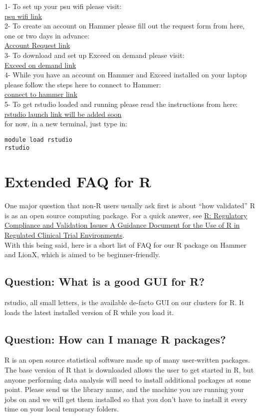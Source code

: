 \documentclass[12pt]{article}
\begin{document}
1- To set up your psu wifi please visit: \\
\href{http://wireless.psu.edu/using.html}{psu wifi link }\\
2- To create an account on Hammer please fill out the request form from here, one or two days in advance:\\
\href{https://rcc.its.psu.edu/resources/accounts/individual/}{Account Request link }\\
3- To download and set up Exceed on demand please visit: \\
\href{http://rcc.its.psu.edu/user_guides/remote_display/exceed_on_demand/}{Exceed on demand link }\\
4- While you have an account on Hammer and Exceed installed on your laptop please follow the steps here to connect to Hammer: \\
\href{http://rcc.its.psu.edu/user_guides/systems/hammer/}{connect to hammer link }\\
5- To get rstudio loaded and running please read the instructions from here: \\
\href{}{rstudio launch link will be added soon }\\
for now, in a new terminal, just type in: 
\begin{verbatim}
module load rstudio
rstudio
\end{verbatim}

\section{Extended FAQ for R}
One major question that non-R users usually ask first is about ``how validated'' R is as an open source computing package. For a quick answer, see \href{http://www.r-project.org/doc/R-FDA.pdf}{R: Regulatory Compliance and Validation Issues A Guidance Document for the Use of R in Regulated Clinical Trial Environments}.\\
With this being said, here is a short list of FAQ for our R package on Hammer and LionX, which is aimed to be beginner-friendly.
\subsection{Question: What is a good GUI for R?}
rstudio, all small letters, is the available de-facto GUI on our clusters for R. It loads the latest installed version of R while you load it. 

\subsection{Question: How can I manage R packages?}
R is an open source statistical software made up of many user-written packages. The base version of R that is downloaded allows the user to get started in R, but anyone performing data analysis will need to install additional packages at some point. Please send us the library name, and the machine you are running your jobs on and we will get them installed so that you don't have to install it every time on your local temporary folders.\\
\end{document}
